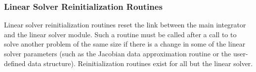 \subsubsection{Linear Solver Reinitialization Routines}\label{sss:lin_solv_reinit}

Linear solver reinitialization routines reset the link between the main {\cvodes}
integrator and the linear solver module. Such a routine must be called after a call
to  to solve another problem of the same size if there is a change
in some of the linear solver parameters (such as the Jacobian data approximation
routine or the user-defined data structure). Reinitialization routines exist for
all but the {\cvdiag} linear solver.

